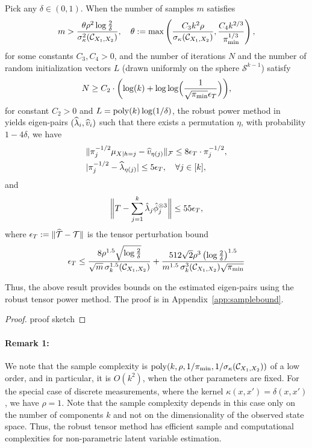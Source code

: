\documentclass{article}
\begin{document}
\begin{theorem}\label{thm:samplebound}
Pick  any $\delta\in (0,1)$. When the number of samples $m$ satisfies
\[ m >\frac{\theta\rho^2  \log\frac{2}{\delta}}{\sigma^2_\kappa(\Ccal_{X_1, X_2})},
\quad \theta:= \max\left(\frac{C_3 k^2 \rho}{\sigma_\kappa( \Ccal_{X_1, X_2})}, \frac{C_4k^{2/3}\iffalse(1+\sigma_{k+1}(\Ccal_{X_1, X_2}))^2 \fi }{\pi_{\min}^{1/3}}\right),\] for some constants $C_3, C_4>0$, and the number of iterations $N$  and  the number of random initialization vectors $L$  (drawn uniformly on the sphere $\mathcal{S}^{k-1}$)  satisfy
\begin{align*}
  N \geq C_2 \cdot \biggl( \log(k) + \log\log\Bigl(
 \frac{1}{\sqrt{\pi_{\min}}\epsilon_T} \Bigr) \biggr),
\end{align*}
for constant $C_2>0$ and  $L = \operatorname{poly}(k) \log(1/\delta)$,  the robust power method in~\cite{AnandkumarEtal:community12} yields eigen-pairs $(\widehat{\lambda}_i, \widehat{v}_i)$ such that there exists a permutation $\eta$, with probability $1-4\delta$, we have
\begin{align*}
&\|\pi^{-1/2}_{j} \mu_{X|h=j}-\widehat{v}_{\eta(j)}\|_{\mathcal{F}} \leq 8 \epsilon_T \cdot\pi^{-1/2}_{j}
, \\
&|\pi^{-1/2}_{j}-\widehat{\lambda}_{\eta(j)}| \leq  5\epsilon_T, \quad \forall j \in [k]
,
\end{align*}
and
\[
\biggl\|
T - \sum_{j=1}^k \hat\lambda_j \hat{\phi}_j^{\otimes 3}
\biggr\| \leq 55\epsilon_T,
\] where $\epsilon_T:= \|\widehat{{\mathcal{T}}} - {\mathcal{T}}\|$ is the tensor perturbation bound
\begin{align*} \epsilon_T \leq
\frac{8 \rho^{1.5} \sqrt{\log\frac{2}{\delta}}}{\sqrt{m} \, \sigma_k^{1.5}(\mathcal{C}_{X_1, X_2})} + \frac{512 \sqrt{2} \rho^3 \left(\log\frac{2}{\delta}\right)^{1.5}}{m^{1.5} \,\sigma_k^{3}(\mathcal{C}_{X_1, X_2}) \sqrt{\pi_{\min}}}\end{align*}
\end{theorem}

Thus, the above result provides bounds on the estimated eigen-pairs using the robust tensor power method. The proof is in Appendix~\ref{app:samplebound}.

\begin{proof}
	proof sketch
\end{proof}

\paragraph{Remark 1:} We note that the sample complexity is  $\operatorname{poly}(k, \rho, 1/\pi_{\min}, 1/\sigma_\kappa(\mathcal{C}_{X_1, X_2}))$ of a low order, and in particular,  it is $O(k^2)$, when the other parameters are fixed. For the special case of discrete measurements, where the kernel $\kappa(x,x')=\delta(x,x')$, we have $\rho=1$. Note that the sample complexity depends in this case only on the number of components $k$ and not on the dimensionality of the observed state space.   Thus, the robust tensor method has efficient sample and computational complexities for non-parametric latent variable estimation.
\end{document}
